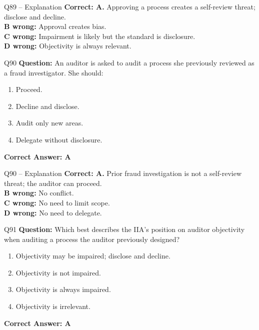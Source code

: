 \documentclass[aspectratio=169,10pt]{beamer}
\begin{document}
	\begin{frame}[t]{Q89 -- Explanation}
		\small
		\textbf{Correct: A.} Approving a process creates a self-review threat; disclose and decline. \\[4pt]
		\textbf{B wrong:} Approval creates bias. \\[2pt]
		\textbf{C wrong:} Impairment is likely but the standard is disclosure. \\[2pt]
		\textbf{D wrong:} Objectivity is always relevant.
	\end{frame}
	
	\begin{frame}[t]{Q90}
		\small
		\textbf{Question:} An auditor is asked to audit a process she previously reviewed as a fraud investigator. She should:
		\begin{enumerate}[label=\Alph*.,itemsep=1pt,topsep=2pt]
			\item Proceed.
			\item Decline and disclose.
			\item Audit only new areas.
			\item Delegate without disclosure.
		\end{enumerate}
		\vspace{4pt}
		\textbf{Correct Answer: A}
	\end{frame}
	
	\begin{frame}[t]{Q90 -- Explanation}
		\small
		\textbf{Correct: A.} Prior fraud investigation is not a self-review threat; the auditor can proceed. \\[4pt]
		\textbf{B wrong:} No conflict. \\[2pt]
		\textbf{C wrong:} No need to limit scope. \\[2pt]
		\textbf{D wrong:} No need to delegate.
	\end{frame}
	
	\begin{frame}[t]{Q91}
		\small
		\textbf{Question:} Which best describes the IIA's position on auditor objectivity when auditing a process the auditor previously designed?
		\begin{enumerate}[label=\Alph*.,itemsep=1pt,topsep=2pt]
			\item Objectivity may be impaired; disclose and decline.
			\item Objectivity is not impaired.
			\item Objectivity is always impaired.
			\item Objectivity is irrelevant.
		\end{enumerate}
		\vspace{4pt}
		\textbf{Correct Answer: A}
	\end{frame}
	
\end{document}
